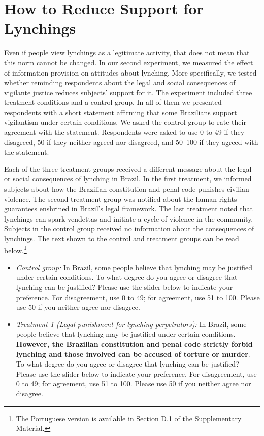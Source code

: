\documentclass[12pt,a4paper]{article}
\providecommand{\tightlist}{%
   \setlength{\itemsep}{0pt}\setlength{\parskip}{0pt}}
\begin{document}
\section{How to Reduce Support for Lynchings}
\label{sec:exp03}

Even if people view lynchings as a legitimate activity, that does not mean that this norm cannot be changed. In our second experiment, we measured the effect of information provision on attitudes about lynching. More specifically, we tested whether reminding respondents about the legal and social consequences of vigilante justice reduces subjects' support for it. The experiment included three treatment conditions and a control group. In all of them we presented respondents with a short statement affirming that some Brazilians support vigilantism under certain conditions. We asked the control group to rate their agreement with the statement. Respondents were asked to use 0 to 49 if they disagreed, 50 if they neither agreed nor disagreed, and 50--100 if they agreed with the statement.

Each of the three treatment groups received a different message about the legal or social consequences of lynching in Brazil. In the first treatment, we informed subjects about how the Brazilian constitution and penal code punishes civilian violence. The second treatment group was notified about the human rights guarantees enshrined in Brazil's legal framework. The last treatment noted that lynchings can spark vendettas and initiate a cycle of violence in the community. Subjects in the control group received no information about the consequences of lynchings. The text shown to the control and treatment groups can be read below.\footnote{The Portuguese version is available in Section D.1 of the Supplementary Material.} 

\begin{itemize}
\tightlist
\item
  \emph{Control group:} In Brazil, some people believe that lynching may be justified under certain conditions. To what degree do you agree or disagree that lynching can be justified? Please use the slider below to indicate your preference. For disagreement, use 0 to 49; for agreement, use 51 to 100. Please use 50 if you neither agree nor disagree.
\end{itemize}

\begin{itemize}
\tightlist
\item
  \emph{Treatment 1 (Legal punishment for lynching perpetrators):} In Brazil, some people believe that lynching may be justified under certain conditions. \textbf{However, the Brazilian constitution and penal code strictly forbid lynching and those involved can be accused of torture or murder}. To what degree do you agree or disagree that lynching can be justified? Please use the slider below to indicate your preference. For disagreement, use 0 to 49; for agreement, use 51 to 100. Please use 50 if you neither agree nor disagree.
\end{itemize}
\end{document}
